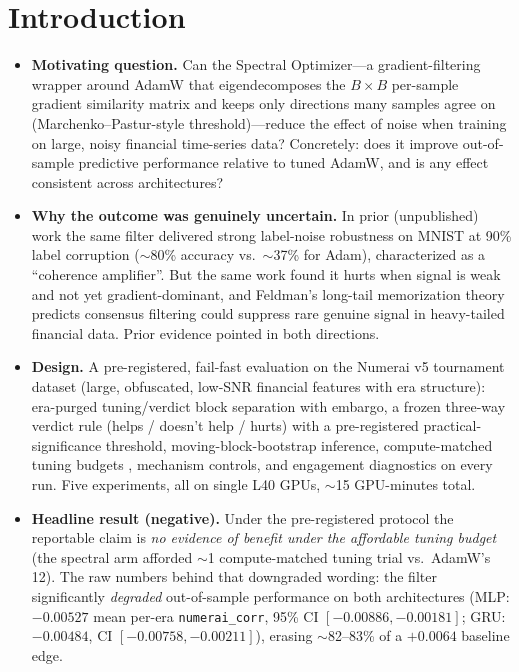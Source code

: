 \section{Introduction}
\label{sec:introduction}


\begin{itemize}
  \item \textbf{Motivating question.} Can the Spectral Optimizer---a
    gradient-filtering wrapper around AdamW that eigendecomposes the
    $B \times B$ per-sample gradient similarity matrix and keeps only
    directions many samples agree on (Marchenko--Pastur-style
    threshold)---reduce the effect of noise when training on large, noisy
    financial time-series data? Concretely: does it improve out-of-sample
    predictive performance relative to tuned AdamW, and is any effect
    consistent across architectures?

  \item \textbf{Why the outcome was genuinely uncertain.} In prior
    (unpublished) work the same filter delivered strong label-noise
    robustness on MNIST at 90\% label corruption ($\sim$80\% accuracy vs.\
    $\sim$37\% for Adam), characterized as a ``coherence amplifier''. But
    the same work found it hurts when signal is weak and not yet
    gradient-dominant, and Feldman's long-tail memorization theory
    \citep{feldman2019longtailmemorization} predicts consensus filtering
    could suppress rare genuine signal in heavy-tailed financial data. Prior
    evidence pointed in both directions.

  \item \textbf{Design.} A pre-registered, fail-fast evaluation on the
    Numerai v5 tournament dataset (large, obfuscated, low-SNR financial
    features with era structure): era-purged tuning/verdict block
    separation with embargo, a frozen three-way verdict rule
    (helps / doesn't help / hurts) with a pre-registered
    practical-significance threshold, moving-block-bootstrap inference,
    compute-matched tuning budgets \citep{schneider2019deepobs}, mechanism
    controls, and engagement diagnostics on every run. Five experiments,
    all on single L40 GPUs, $\sim$15 GPU-minutes total.

  \item \textbf{Headline result (negative).} Under the pre-registered
    protocol the reportable claim is \emph{no evidence of benefit under the
    affordable tuning budget} (the spectral arm afforded $\sim$1
    compute-matched tuning trial vs.\ AdamW's 12). The raw numbers behind
    that downgraded wording: the filter significantly \emph{degraded}
    out-of-sample performance on both architectures (MLP: $-0.00527$ mean
    per-era \texttt{numerai\_corr}, 95\% CI $[-0.00886, -0.00181]$;
    GRU: $-0.00484$, CI $[-0.00758, -0.00211]$), erasing $\sim$82--83\% of
    a $+0.0064$ baseline edge.


\end{itemize}

